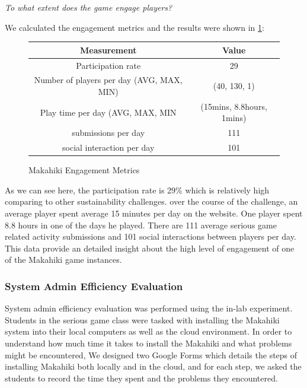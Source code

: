 \documentclass{sigchi}
\newcommand\tabhead[1]{\small\textbf{#1}}
\begin{document}
\emph{To what extent does the game engage players?}

We calculated the engagement metrics and the results were shown in \ref{fig:makahiki-engagement}:
\begin{figure}
  \centering
  \begin{tabular}{|c|c|}
    \hline
    \multicolumn{1}{|p{0.3\columnwidth}|}{\centering\tabhead{Measurement}} &
    \multicolumn{1}{|p{0.65\columnwidth}|}{\centering\tabhead{Value}} \\
    \hline
    \multicolumn{1}{|p{0.3\columnwidth}|}{Participation rate} &
    \multicolumn{1}{|p{0.65\columnwidth}|}{29} \\
    \hline
    \multicolumn{1}{|p{0.3\columnwidth}|}{Number of players per day (AVG, MAX, MIN)} &
    \multicolumn{1}{|p{0.65\columnwidth}|}{(40, 130, 1)} \\
    \hline
    \multicolumn{1}{|p{0.3\columnwidth}|}{Play time per day (AVG, MAX, MIN} &
    \multicolumn{1}{|p{0.65\columnwidth}|}{(15mins, 8.8hours, 1mins)} \\
    \hline
    \multicolumn{1}{|p{0.3\columnwidth}|}{submissions per day} &
    \multicolumn{1}{|p{0.65\columnwidth}|}{111} \\
    \hline
    \multicolumn{1}{|p{0.3\columnwidth}|}{social interaction per day} &
    \multicolumn{1}{|p{0.65\columnwidth}|}{101} \\
    \hline
  \end{tabular}
  \caption{Makahiki Engagement Metrics}
  \label{fig:makahiki-engagement}
\end{figure}

As we can see here, the participation rate is 29\% which is relatively high comparing to other sustainability challenges. over the course of the challenge, an average player spent average 15 minutes per day on the website. One player spent 8.8 hours in one of the days he played. There are 111 average serious game related activity submissions and 101 social interactions between players per day. This data provide an detailed insight about the high level of engagement of one of the Makahiki game instances.

\subsubsection{System Admin Efficiency Evaluation}

System admin efficiency evaluation was performed using the in-lab experiment.
Students in the serious game class were tasked with installing the Makahiki
system into their local computers as well as the cloud environment. In
order to understand how much time it takes to install the Makahiki and
what problems might be encountered, We designed two Google Forms which
details the steps of installing Makahiki both locally and in the
cloud, and for each step, we asked the students to record the time
they spent and the problems they encountered.
\end{document}
